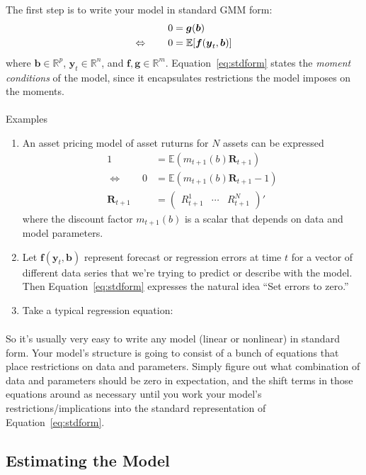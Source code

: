 \documentclass[12pt]{article}
\theoremstyle{plain}
\theoremstyle{definition}
\theoremstyle{remark}
\newcommand{\bsb}{\boldsymbol{b}}
\newcommand{\bsg}{\boldsymbol{g}}
\newcommand{\bsy}{\boldsymbol{y}}
\begin{document}
The first step is to write your model in standard GMM form:
\begin{align}
  0 &= \bsg(\bsb)\label{eq:stdform}\\
  \Leftrightarrow\qquad
  0 &= \mathbb{E}[\boldsymbol{f}(\bsy_t,\bsb)]
  \notag
\end{align}
where $\bsb\in\mathbb{R}^p$,
$\bsy_t\in\mathbb{R}^n$, and $\boldsymbol{f},
\bsg\in\mathbb{R}^m$.  Equation~\ref{eq:stdform} states the
\emph{moment conditions} of the model, since it encapsulates
restrictions the model imposes on the moments.
\\
\\
Examples
\begin{enumerate}
  \item An asset pricing model of asset ruturns for $N$ assets can be
    expressed
    \begin{align*}
      1 &= \mathbb{E}(m_{t+1}(b) \boldsymbol{R}_{t+1}) \\
      \Leftrightarrow \qquad
      0 &= \mathbb{E}(m_{t+1}(b) \boldsymbol{R}_{t+1}-1)\\
      \boldsymbol{R}_{t+1} &=
      \begin{pmatrix}
        R^1_{t+1}
        &\cdots&
        R^N_{t+1}
      \end{pmatrix}'
    \end{align*}
    where the discount factor $m_{t+1}(b)$ is a scalar that depends on
    data and model parameters.
  \item Let $\boldsymbol{f}(\bsy_t,\bsb)$ represent
    forecast or regression errors at time $t$ for a vector of different
    data series that we're trying to predict or describe with the model.
    Then Equation~\ref{eq:stdform} expresses the natural idea ``Set
    errors to zero.''
  \item Take a typical regression equation:
    \begin{align*}
    \end{align*}
\end{enumerate}
So it's usually very easy to write any model (linear or nonlinear) in
standard form. Your model's structure is going to consist of a bunch of
equations that place restrictions on data and parameters.  Simply figure
out what combination of data and parameters should be zero in
expectation, and the shift terms in those equations around as necessary
until you work your model's restrictions/implications into the standard
representation of Equation~\ref{eq:stdform}.

\clearpage
\subsection{Estimating the Model}
\end{document}
